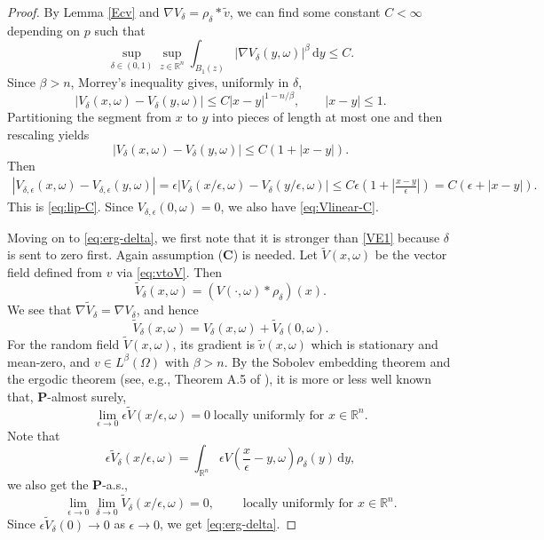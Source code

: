 \documentclass[11pt,reqno]{amsart}
\theoremstyle{definition}
\theoremstyle{remark}
\numberwithin{equation}{section}
\newcommand{\eps}{\epsilon}
\newcommand{\R}{{\mathbb{R}}}
\newcommand{\dd}{\mathrm{d}}
\begin{document}
\begin{proof}By Lemma \ref{Ecv} and $\nabla V_\delta=\rho_\delta*\widetilde v$, we can find some constant $C<\infty$ depending on $p$ such that 
\[
 \sup_{\delta\in(0,1)}\sup_{z\in\mathbb R^n}
 \int_{B_1(z)}|\nabla V_\delta(y,\omega)|^\beta\,\mathrm dy
 \leq C.
\]
Since $\beta>n$, Morrey's inequality gives, uniformly in $\delta$,
\[
 |V_\delta(x,\omega)-V_\delta(y,\omega)|
 \leq C|x-y|^{1-n/\beta},
 \qquad |x-y|\leq1.
\]
Partitioning the segment from $x$ to $y$ into pieces of length at
most one and then rescaling yields
\begin{equation*}
 |V_\delta(x,\omega)-V_\delta(y,\omega)| \leq C(1+|x-y|).
\end{equation*}
Then
\begin{align*}
|V_{\delta,\epsilon}(x,\omega)
-V_{\delta,\epsilon}(y,\omega)|
=  \epsilon |V_\delta(x/\epsilon,\omega) -V_\delta(y/\epsilon,\omega)|
\leq  C\epsilon
\left(
1+\left|\frac{x-y}{\epsilon}\right|
\right) =
C(\epsilon+|x-y|).
\end{align*}
This is \eqref{eq:lip-C}. Since $V_{\delta,\epsilon}(0,\omega)=0$, we also have \eqref{eq:Vlinear-C}.

\medskip 

Moving on to \eqref{eq:erg-delta}, we first note that it is stronger than \eqref{VE1} because $\delta$ is sent to zero first. Again assumption ({\bf C}) is needed. Let $\widetilde V(x,\omega)$ be the vector field defined from $v$ via \eqref{eq:vtoV}. Then
\begin{equation*}
    \widetilde{V}_\delta(x,\omega) = (V(\cdot,\omega)*\rho_\delta)(x).
\end{equation*}
We see that $\nabla \widetilde{V}_\delta = \nabla V_\delta$, and hence
\begin{equation*}
    \widetilde{V}_\delta(x,\omega) = V_\delta(x,\omega) + \widetilde{V}_\delta(0,\omega).
\end{equation*}
For the random field $\widetilde{V}(x,\omega)$, its gradient is $\widetilde{v}(x,\omega)$ which is stationary and mean-zero, and $v \in L^\beta(\Omega)$ with $\beta > n$. By the Sobolev embedding theorem and the ergodic theorem (see, e.g., Theorem A.5 of \cite{MR2914944}), it is more or less well known that, $\mathbf{P}$-almost surely,
\begin{equation*}
    \lim_{\eps\to 0} \eps \widetilde{V}(x/\eps,\omega) = 0 \;\text{locally uniformly for $x \in \R^n$}.
\end{equation*}
Note that
\begin{equation*}
    \eps\widetilde{V}_\delta(x/\eps,\omega) = \int_{\R^n} \eps V(\frac{x}{\eps} - y,\omega)\rho_\delta(y)\,\dd y,
\end{equation*}
we also get the $\mathbf{P}$-a.s.,
\begin{equation*}
    \lim_{\epsilon\to 0}\lim_{\delta\to 0}\widetilde{V}_{\delta}(x/\eps,\omega) = 0, \qquad \;\text{locally uniformly for $x \in \R^n$}.
\end{equation*}
Since $\eps \widetilde{V}_\delta(0) \to 0$ as $\eps\to 0$, we get \eqref{eq:erg-delta}.
\end{proof}
\end{document}
